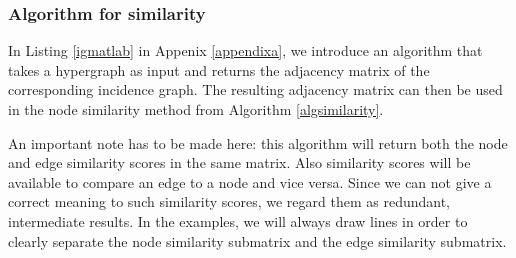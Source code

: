 \documentclass[a4paper,11pt]{report}
\begin{document}
\subsubsection{Algorithm for similarity}
  In Listing \ref{igmatlab} in Appenix \ref{appendixa}, we introduce 
 an algorithm that 
  takes a hypergraph as input and returns the adjacency matrix of the 
  corresponding incidence graph. The 
  resulting adjacency matrix can then be used in the node similarity method from 
  Algorithm \ref{algsimilarity}.
  
  An important note has to be made here: this algorithm will return both the 
  node and edge similarity scores in the same matrix. Also similarity scores 
  will be available to compare an edge to a node and vice versa. Since we can not give a correct meaning
  to such similarity scores, we regard them as redundant, intermediate results. In the examples, we will always draw lines
  in order to clearly separate the node similarity submatrix and the edge 
  similarity submatrix.
\end{document}

